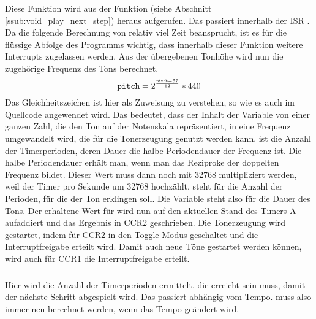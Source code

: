 \subsubsection{} %
\label{ssub:void_ton}
Diese Funktion wird aus der Funktion  (siehe Abschnitt \ref{ssub:void_play_next_step}) heraus aufgerufen. Das passiert innerhalb der ISR . Da die folgende Berechnung von  relativ viel Zeit beansprucht, ist es für die flüssige Abfolge des Programms wichtig, dass innerhalb dieser Funktion weitere Interrupts zugelassen werden. Aus der übergebenen Tonhöhe wird nun die zugehörige Frequenz des Tons berechnet.
\[
\texttt{pitch}=2^\frac{\texttt{pitch}-57}{12}*440
\]
Das Gleichheitszeichen ist hier als Zuweisung zu verstehen, so wie es auch im Quellcode angewendet wird. Das bedeutet, dass der Inhalt der Variable  von einer ganzen Zahl, die den Ton auf der Notenskala repräsentiert, in eine Frequenz umgewandelt wird, die für die Tonerzeugung genutzt werden kann.
\newline
{} ist die Anzahl der Timerperioden, deren Dauer die halbe Periodendauer der Frequenz ist. Die halbe Periodendauer erhält man, wenn man das Reziproke der doppelten Frequenz bildet. Dieser Wert muss dann noch mit 32768 multipliziert werden, weil der Timer pro Sekunde um 32768 hochzählt.  steht für die Anzahl der Perioden, für die der Ton erklingen soll. Die Variable steht also für die Dauer des Tons.
\newline
Der erhaltene Wert für  wird nun auf den aktuellen Stand des Timers A aufaddiert und das Ergebnis in CCR2 geschrieben. Die Tonerzeugung wird gestartet, indem für CCR2 in den Toggle-Modus geschaltet und die Interruptfreigabe erteilt wird. Damit auch neue Töne gestartet werden können, wird auch für CCR1 die Interruptfreigabe erteilt.

\subsubsection{} %
\label{ssub:void_update_tempo}
Hier wird die Anzahl der Timerperioden ermittelt, die erreicht sein muss, damit der nächste Schritt abgespielt wird. Das passiert abhängig vom Tempo.  muss also immer neu berechnet werden, wenn das Tempo geändert wird.

